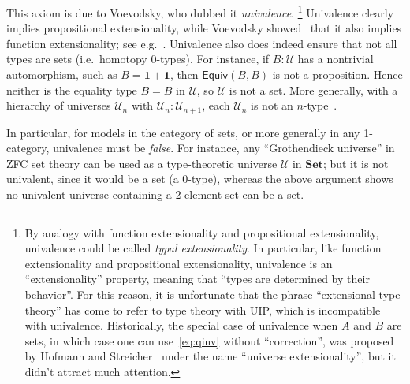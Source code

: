 \documentclass[10pt]{article}
\def\U{\mathscr{U}}
\def\equiv{\mathsf{Equiv}}
\def\unit{\mathbf{1}}
\numberwithin{equation}{section}
\begin{document}
This axiom is due to Voevodsky, who dubbed it \emph{univalence}.%
\footnote{By analogy with function extensionality and propositional extensionality, univalence could be called \emph{typal extensionality}.
  In particular, like function extensionality and propositional extensionality, univalence is an ``extensionality'' property, meaning that ``types are determined by their behavior''.
  For this reason, it is unfortunate that the phrase ``extensional type theory'' has come to refer to type theory with UIP, which is incompatible with univalence.
  Historically, the special case of univalence when $A$ and $B$ are sets, in which case one can use~\eqref{eq:qinv} without ``correction'', was proposed by Hofmann and Streicher~\cite{hs:gpd-typethy} under the name ``universe extensionality'', but it didn't attract much attention.}
Univalence clearly implies propositional extensionality, %
while Voevodsky showed~\cite{vv:unimath} that it also implies function extensionality; see e.g.~\cite[\S4.9]{hottbook}.
Univalence also does indeed ensure that not all types are sets (i.e.\ homotopy 0-types).
For instance, if $B:\U$ has a nontrivial automorphism, such as $B=\unit+\unit$, then $\equiv(B,B)$ is not a proposition.
Hence neither is the equality type $B=B$ in $\U$, so $\U$ is not a set.
More generally, with a hierarchy of universes $\U_n$ with $\U_n : \U_{n+1}$, each $\U_n$ is not an $n$-type~\cite{ks:u-not-ntype}.

In particular, for models in the category of sets, or more generally in any 1-category, univalence must be \emph{false}.
For instance, any ``Grothendieck universe'' in ZFC set theory can be used as a type-theoretic universe $\U$ in $\mathbf{Set}$; but it is not univalent, since it would be a set (a 0-type), whereas the above argument shows no univalent universe containing a 2-element set can be a set.
\end{document}
